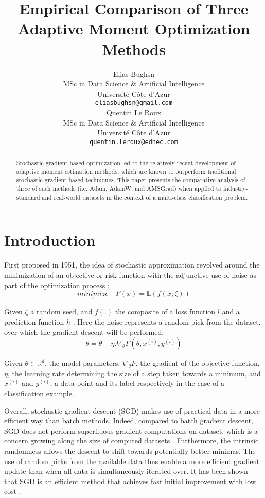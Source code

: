 \documentclass{article} %
\title{Empirical Comparison of Three Adaptive Moment Optimization Methods}
\author{Elias Bughsn \\
MSc in Data Science \& Artificial Intelligence \\
Université Côte d'Azur \\
\texttt{eliasbughsn@gmail.com} \\
\And
Quentin Le Roux \\
MSc in Data Science \& Artificial Intelligence \\
Université Côte d'Azur \\
\texttt{quentin.leroux@edhec.com}}
\begin{document}
\maketitle

\begin{abstract}
Stochastic gradient-based optimization led to the relatively recent development of adaptive 
moment estimation methods, which are known to outperform traditional stochastic gradient-based 
techniques. This paper presents the comparative analysis of three of such methods (i.e. 
Adam, AdamW, and AMSGrad) when applied to industry-standard and real-world datasets in 
the context of a multi-class classification problem.
\end{abstract}

\section{Introduction}

First proposed in 1951, the idea of stochastic approximation revolved around the minimization 
of an objective or risk function with the adjunctive use of noise as part of the optimization 
process \citep{10.1214/aoms/1177729586}:
$$\underset{x}{minimize}\quad F(x) = \mathbb{E}(f(x;\zeta))$$ 

Given $\zeta$ a random seed, and $f(.)$ the composite of a loss function $l$ and a prediction 
function $h$ \citep{bottou2018optimization}. Here the noise represents a random pick from 
the dataset, over which the gradient descent will be performed:
$$\theta = \theta - \eta . \nabla_\theta F(\theta, x^{(i)}, y^{(i)})$$ 

Given $\theta \in \mathbb{R}^d$, the model parameters, $\nabla_\theta F$, the gradient of the 
objective function, $\eta$, the learning rate determining the size of a step taken towards a 
minimum, and $x^{(i)}$ and $y^{(i)}$, a data point and its label respectively in the case
of a classification example.

Overall, stochastic gradient descent (SGD) makes use of practical data in a more efficient 
way than batch methods. Indeed, compared to batch gradient descent, SGD does not perform 
superfluous gradient computations on dataset, which is a concern growing along the size of
computed datasets \citep{ruder2017overview}. Furthermore, the intrinsic randomness allows
the descent to shift towards potentially better minimas. The use of random picks from the 
available data thus enable a more efficient gradient update than when all data is simultaneously 
iterated over. It has been shown that SGD is an efficient method that achieves fast initial 
improvement with low cost \citep{SAvSAA}.
\end{document}
